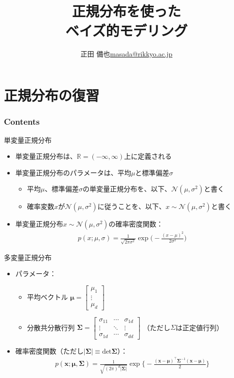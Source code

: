 \documentclass[aspectratio=169,unicode,dvipdfmx,14pt]{beamer}
\title{ \\正規分布を使った\\ベイズ的モデリング}
\author{\texorpdfstring{正田 備也\newline\href{mailto:masada@rikkyo.ac.jp}{masada@rikkyo.ac.jp}}{正田 備也}}
\date{}
\begin{document}
\begin{frame}
\titlepage
\end{frame}

\section{正規分布の復習}

\begin{frame}\frametitle{Contents}
\Large \tableofcontents[currentsection]
\end{frame}

\begin{frame}{単変量正規分布}
\begin{itemize}
\item 単変量正規分布は、$\mathbb{R}=(-\infty,\infty)$上に定義される
\item 単変量正規分布のパラメータは、平均$\mu$と標準偏差$\sigma$
\begin{itemize}
\item 平均$\mu$、標準偏差$\sigma$の単変量正規分布を、以下、$\mathcal{N}(\mu,\sigma^2)$と書く
\item 確率変数$x$が$\mathcal{N}(\mu,\sigma^2)$に従うことを、以下、$x\sim\mathcal{N}(\mu,\sigma^2)$と書く
\end{itemize}
\item 単変量正規分布$x\sim\mathcal{N}(\mu,\sigma^2)$の確率密度関数：
\begin{align}
p(x;\mu,\sigma) = \frac{1}{\sqrt{2\pi\sigma^2}}\exp\Big( - \frac{(x - \mu)^2}{2\sigma^2} \Big)
\end{align}
\end{itemize}
\end{frame}

\begin{frame}{多変量正規分布}
\begin{itemize}
\item パラメータ：
\begin{itemize}
\item 平均ベクトル
$\bm{\mu} = \begin{bmatrix} \mu_1 \\ \vdots \\ \mu_d \end{bmatrix}$
\item 分散共分散行列
$\bm{\Sigma} = \begin{bmatrix} \sigma_{11} & \cdots & \sigma_{1d} \\ 
\vdots & \ddots & \vdots \\
\sigma_{1d} & \cdots & \sigma_{dd} \end{bmatrix}$
（ただし$\Sigma$は正定値行列）
\end{itemize}
\item 確率密度関数（ただし$| \bm{\Sigma} | \equiv \mbox{det}\bm{\Sigma}$）：
\begin{align}
p(\bm{x};\bm{\mu},\bm{\Sigma}) = \frac{1}{\sqrt{(2\pi)^d|\bm{\Sigma}|}}\exp\bigg\{ - \frac{(\bm{x} - \bm{\mu})^\intercal \bm{\Sigma}^{-1} (\bm{x} -\bm{\mu})}{2} \bigg\}
\end{align}
\end{itemize}
\end{frame}
\end{document}
